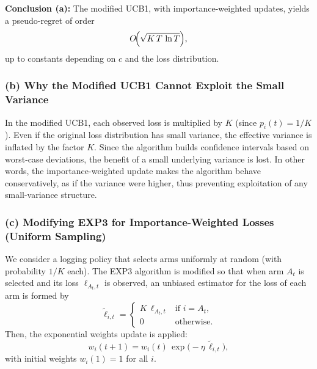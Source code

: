\medskip
\noindent
\textbf{Conclusion (a):}  
The modified UCB1, with importance-weighted updates, yields a pseudo-regret of order 
\[
  O\!\Bigl(\sqrt{K\,T\,\ln T}\Bigr),
\]
up to constants depending on \(c\) and the loss distribution.

\bigskip
\subsubsection*{(b) Why the Modified UCB1 Cannot Exploit the Small Variance}

In the modified UCB1, each observed loss is multiplied by \(K\) (since \(p_i(t)=1/K\)).  
Even if the original loss distribution has small variance, the effective variance is inflated by the factor \(K\).  
Since the algorithm builds confidence intervals based on worst-case deviations, the benefit of a small underlying variance is lost.  
In other words, the importance-weighted update makes the algorithm behave conservatively, as if the variance were higher, thus preventing exploitation of any small-variance structure.

\bigskip
\subsubsection*{(c) Modifying EXP3 for Importance-Weighted Losses (Uniform Sampling)}

We consider a logging policy that selects arms uniformly at random (with probability \(1/K\) each).  
The EXP3 algorithm is modified so that when arm \(A_t\) is selected and its loss \(\ell_{A_t,t}\) is observed, an unbiased estimator for the loss of each arm is formed by
\[
   \tilde{\ell}_{i,t}=
   \begin{cases}
     K\,\ell_{A_t,t} & \text{if } i=A_t,\\[1mm]
     0 & \text{otherwise.}
   \end{cases}
\]
Then, the exponential weights update is applied:
\[
   w_i(t+1)=w_i(t)\,\exp\bigl(-\eta\,\tilde{\ell}_{i,t}\bigr),
\]
with initial weights \(w_i(1)=1\) for all \(i\).

